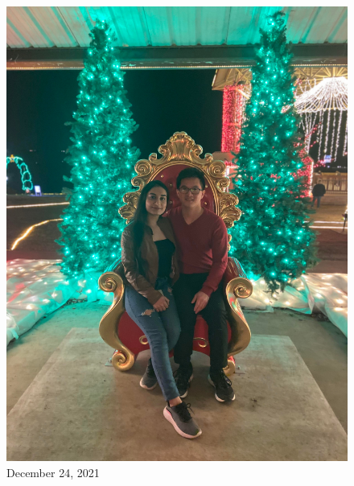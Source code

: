 \documentclass[
]{book}
\begin{document}
\begin{figure}
\centering
\includegraphics[width=5.20833in,height=\textheight]{mimages/14 12-24-2021.jpg}
\caption{December 24, 2021}
\end{figure}
\end{document}
